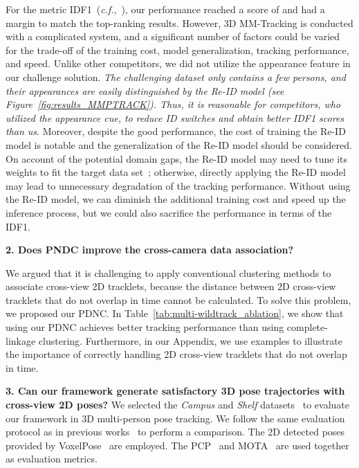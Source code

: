 \documentclass{CVM}
\begin{document}
For the metric IDF1~(\textit{c.f.},~\cite{MOTChallenge2015,milan2016mot16}), our performance reached a score of  and had a margin to match the top-ranking results. However, 3D MM-Tracking is conducted with a complicated system, and a significant number of factors could be varied for the trade-off of the training cost, model generalization, tracking performance, and speed. Unlike other competitors, we did not utilize the appearance feature in our challenge solution. \textit{The challenging dataset only contains a few persons, and their appearances are easily distinguished by the Re-ID model (see Figure~\ref{fig:results_MMPTRACK}). Thus, it is reasonable for competitors, who utilized the appearance cue, to reduce ID switches and obtain better IDF1 scores than us}. Moreover, despite the good performance, the cost of training the Re-ID model is notable and the generalization of the Re-ID model should be considered. On account of the potential domain gaps, the Re-ID model may need to tune its weights to fit the target data set~\cite{sha2020progressive, yang2020remots, yang2021remot}; otherwise, directly applying the Re-ID model may lead to unnecessary degradation of the tracking performance. 
Without using the Re-ID model, we can diminish the additional training cost and speed up the inference process, but we could also sacrifice the performance in terms of the IDF1. 



\textbf{2. Does PNDC improve the cross-camera data association?} 

We argued that it is challenging to apply conventional clustering methods to associate cross-view 2D tracklets, because the distance between 2D cross-view tracklets that do not overlap in time cannot be calculated. To solve this problem, we proposed our PDNC. In Table~\ref{tab:multi-wildtrack_ablation}, we show that using our PDNC achieves better tracking performance than using complete-linkage clustering. Furthermore, in our Appendix, we use examples to illustrate the importance of correctly handling 2D cross-view tracklets that do not overlap in time.





\textbf{3. Can our framework generate satisfactory 3D pose trajectories with cross-view 2D poses?} We selected the \textit{Campus} and \textit{Shelf} datasets~\cite{fleuret2007multicamera,BelagiannisAASN16} to evaluate our framework in 3D multi-person pose tracking. 
We follow the same evaluation protocol as in previous works~\cite{dong2019fast, tu2020voxelpose, zhang2022voxeltrack, zhang20204d} to perform a comparison. The 2D detected poses provided by VoxelPose~\cite{tu2020voxelpose} are employed. The PCP~\cite{fleuret2007multicamera, BelagiannisAASN16} and MOTA~\cite{milan2016mot16} are used together as evaluation metrics. 
\end{document}
